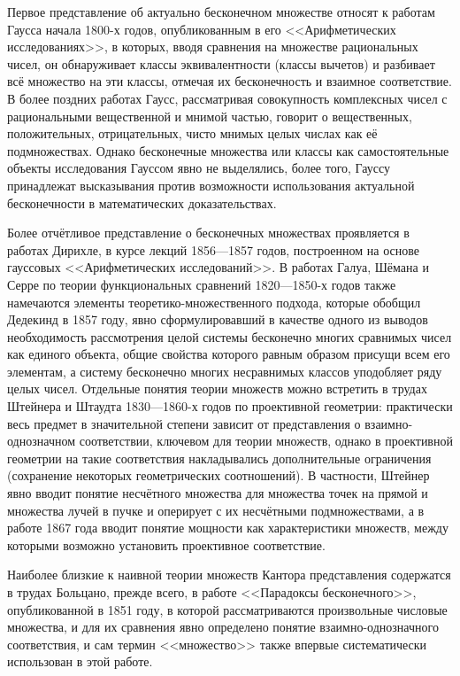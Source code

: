 \documentclass[12pt]{extarticle}
\begin{document}
Первое представление об актуально бесконечном множестве относят к работам Гаусса начала 1800-х годов, опубликованным в его <<Арифметических исследованиях>>, в которых, вводя сравнения на множестве рациональных чисел, он обнаруживает классы эквивалентности (классы вычетов) и разбивает всё множество на эти классы, отмечая их бесконечность и взаимное соответствие. В более поздних работах Гаусс, рассматривая совокупность комплексных чисел с рациональными вещественной и мнимой частью, говорит о вещественных, положительных, отрицательных, чисто мнимых целых числах как её подмножествах. Однако бесконечные множества или классы как самостоятельные объекты исследования Гауссом явно не выделялись, более того, Гауссу принадлежат высказывания против возможности использования актуальной бесконечности в математических доказательствах.

Более отчётливое представление о бесконечных множествах проявляется в работах Дирихле, в курсе лекций 1856—1857 годов, построенном на основе гауссовых <<Арифметических исследований>>. В работах Галуа, Шёмана и Серре по теории функциональных сравнений 1820—1850-х годов также намечаются элементы теоретико-множественного подхода, которые обобщил Дедекинд в 1857 году, явно сформулировавший в качестве одного из выводов необходимость рассмотрения целой системы бесконечно многих сравнимых чисел как единого объекта, общие свойства которого равным образом присущи всем его элементам, а систему бесконечно многих несравнимых классов уподобляет ряду целых чисел. Отдельные понятия теории множеств можно встретить в трудах Штейнера и Штаудта 1830—1860-х годов по проективной геометрии: практически весь предмет в значительной степени зависит от представления о взаимно-однозначном соответствии, ключевом для теории множеств, однако в проективной геометрии на такие соответствия накладывались дополнительные ограничения (сохранение некоторых геометрических соотношений). В частности, Штейнер явно вводит понятие несчётного множества для множества точек на прямой и множества лучей в пучке и оперирует с их несчётными подмножествами, а в работе 1867 года вводит понятие мощности как характеристики множеств, между которыми возможно установить проективное соответствие.

Наиболее близкие к наивной теории множеств Кантора представления содержатся в трудах Больцано, прежде всего, в работе <<Парадоксы бесконечного>>, опубликованной в 1851 году, в которой рассматриваются произвольные числовые множества, и для их сравнения явно определено понятие взаимно-однозначного соответствия, и сам термин <<множество>> также впервые систематически использован в этой работе. 
\end{document}
